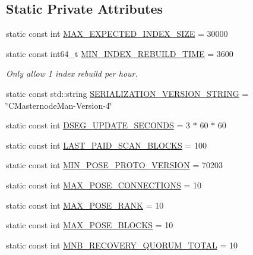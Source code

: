 \subsection*{Static Private Attributes}
\begin{DoxyCompactItemize}
\item 
static const int \mbox{\hyperlink{class_c_masternode_man_a0df5b1425bc466f1c631b22f50db14d6}{M\+A\+X\+\_\+\+E\+X\+P\+E\+C\+T\+E\+D\+\_\+\+I\+N\+D\+E\+X\+\_\+\+S\+I\+ZE}} = 30000
\item 
static const int64\+\_\+t \mbox{\hyperlink{class_c_masternode_man_acb06073cb09128c2f8597b6aec79b081}{M\+I\+N\+\_\+\+I\+N\+D\+E\+X\+\_\+\+R\+E\+B\+U\+I\+L\+D\+\_\+\+T\+I\+ME}} = 3600
\begin{DoxyCompactList}\small\item\em Only allow 1 index rebuild per hour. \end{DoxyCompactList}\item 
static const std\+::string \mbox{\hyperlink{class_c_masternode_man_ab2c06baaaff8b9f4fafcc4481e42ca2e}{S\+E\+R\+I\+A\+L\+I\+Z\+A\+T\+I\+O\+N\+\_\+\+V\+E\+R\+S\+I\+O\+N\+\_\+\+S\+T\+R\+I\+NG}} = \char`\"{}C\+Masternode\+Man-\/Version-\/4\char`\"{}
\item 
static const int \mbox{\hyperlink{class_c_masternode_man_a680676de0a99bd90fc82d42059a1f96d}{D\+S\+E\+G\+\_\+\+U\+P\+D\+A\+T\+E\+\_\+\+S\+E\+C\+O\+N\+DS}} = 3 $\ast$ 60 $\ast$ 60
\item 
static const int \mbox{\hyperlink{class_c_masternode_man_ad9dfa88df8f64f47fc7f88a6ff9f2f6e}{L\+A\+S\+T\+\_\+\+P\+A\+I\+D\+\_\+\+S\+C\+A\+N\+\_\+\+B\+L\+O\+C\+KS}} = 100
\item 
static const int \mbox{\hyperlink{class_c_masternode_man_a741a476f939ae10ac5bd5358f4d5e0e2}{M\+I\+N\+\_\+\+P\+O\+S\+E\+\_\+\+P\+R\+O\+T\+O\+\_\+\+V\+E\+R\+S\+I\+ON}} = 70203
\item 
static const int \mbox{\hyperlink{class_c_masternode_man_af0091eee2a4d9d29a1e979ea30d81730}{M\+A\+X\+\_\+\+P\+O\+S\+E\+\_\+\+C\+O\+N\+N\+E\+C\+T\+I\+O\+NS}} = 10
\item 
static const int \mbox{\hyperlink{class_c_masternode_man_a5c6882ce05a78edb128dcfabebc5ea27}{M\+A\+X\+\_\+\+P\+O\+S\+E\+\_\+\+R\+A\+NK}} = 10
\item 
static const int \mbox{\hyperlink{class_c_masternode_man_aeaf7b7270813b257adead2183d7b0318}{M\+A\+X\+\_\+\+P\+O\+S\+E\+\_\+\+B\+L\+O\+C\+KS}} = 10
\item 
static const int \mbox{\hyperlink{class_c_masternode_man_a4803b8a7ea940b409949cb1593ebb822}{M\+N\+B\+\_\+\+R\+E\+C\+O\+V\+E\+R\+Y\+\_\+\+Q\+U\+O\+R\+U\+M\+\_\+\+T\+O\+T\+AL}} = 10

\end{DoxyCompactItemize}
